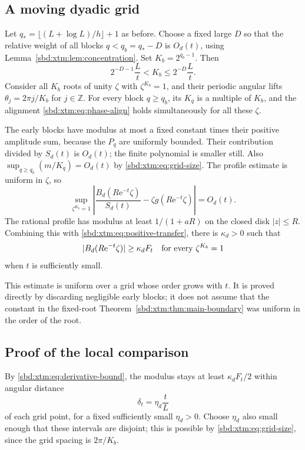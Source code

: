\documentclass[11pt,a4paper]{article}
\theoremstyle{definition}
\newcommand{\e}{\mathrm e}
\begin{document}
\subsection{A moving dyadic grid}
Let $q_* =\lfloor(L+\log L)/h\rfloor+1$ as before. Choose a fixed large $D$
so that the relative weight of all blocks $q<q_b=q_*-D$ is $O_d(t)$, using
Lemma~\ref{sbd:xtm:lem:concentration}. Set $K_b=2^{q_b-1}$. Then
\begin{equation}\label{sbd:xtm:eq:grid-size}
 2^{-D-1}\frac Lt<K_b\le2^{-D}\frac Lt.
\end{equation}
Consider all $K_b$ roots of unity $\zeta$ with $\zeta^{K_b}=1$, and their
periodic angular lifts $\theta_j=2\pi j/K_b$ for $j\in\mathbb Z$. For every
block $q\ge q_b$, its $K_q$ is a multiple of $K_b$, and the alignment
\eqref{sbd:xtm:eq:phase-align} holds simultaneously for all these $\zeta$.

The early blocks have modulus at most a fixed constant times their positive
amplitude sum, because the $P_q$ are uniformly bounded. Their contribution
divided by $S_d(t)$ is $O_d(t)$; the finite polynomial is smaller still.
Also $\sup_{q\ge q_b}(m/K_q)=O_d(t)$ by \eqref{sbd:xtm:eq:grid-size}. The
profile estimate is uniform in $\zeta$, so
\begin{equation}\label{sbd:xtm:eq:uniform-grid}
 \sup_{\zeta^{K_b}=1}
 \left|\frac{B_d(R\e^{-t}\zeta)}{S_d(t)}
               -\zeta g(R\e^{-t}\zeta)\right|=O_d(t).
\end{equation}
The rational profile has modulus at least $1/(1+aR)$ on the closed disk
$|z|\le R$. Combining this with \eqref{sbd:xtm:eq:positive-transfer}, there
is $\kappa_d>0$ such that
\begin{equation}\label{sbd:xtm:eq:grid-lower}
 |B_d(R\e^{-t}\zeta)|\ge\kappa_d F_t
 \quad\hbox{for every }\zeta^{K_b}=1
\end{equation}
when $t$ is sufficiently small.

This estimate is uniform over a grid whose order grows with $t$. It is
proved directly by discarding negligible early blocks; it does not assume
that the constant in the fixed-root Theorem~\ref{sbd:xtm:thm:main-boundary}
was uniform in the order of the root.

\subsection{Proof of the local comparison}
By \eqref{sbd:xtm:eq:derivative-bound}, the modulus stays at least
$\kappa_dF_t/2$ within angular distance
\begin{equation}\label{sbd:xtm:eq:arc-width}
 \delta_t=\eta_d\frac tL
\end{equation}
of each grid point, for a fixed sufficiently small $\eta_d>0$. Choose
$\eta_d$ also small enough that these intervals are disjoint; this is
possible by \eqref{sbd:xtm:eq:grid-size}, since the grid spacing is
$2\pi/K_b$.
\end{document}
